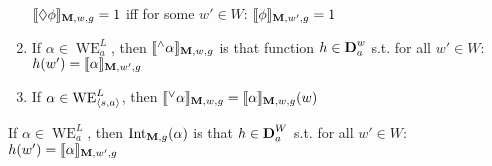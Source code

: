 \documentclass[11pt]{article}
\DeclareMathOperator{\WE}{WE}
\DeclareMathOperator{\Int}{Int}
\begin{document}
\begin{definition}[]
\begin{enumerate}
\(\llbracket\Diamond\phi\rrbracket_{\operatorname{\textbf{M}},w,g}=1\) iff for some \(w'\in W\):
\(\llbracket\phi\rrbracket_{\operatorname{\textbf{M}},w',g}=1\)

\item If \(\alpha\in\WE_a^L\), then
\(\llbracket{}^\wedge\alpha\rrbracket_{\operatorname{\textbf{M}},w,g}\) is that function
\(h\in\operatorname{\textbf{D}}^w_a\) s.t. for all \(w'\in W\): \(h(w')=\llbracket\alpha\rrbracket_{\operatorname{\textbf{M}},w',g}\)

\item If \(\alpha\in\WE^L_{\la s,a\ra}\), then
\(\llbracket{}^\vee\alpha\rrbracket_{\operatorname{\textbf{M}},w,g}=
      \llbracket\alpha\rrbracket_{\operatorname{\textbf{M}},w,g}(w)\)
\end{enumerate}
\end{definition}

\begin{definition}[]
If \(\alpha\in\WE_a^L\), then \(\Int_{\bM,g}(\alpha)\) is that \(h\in\operatorname{\textbf{D}}^W_a\)
s.t. for all \(w'\in W\):\(h(w')=\llbracket\alpha\rrbracket_{\operatorname{\textbf{M}},w',g}\)
\end{definition}
\end{document}
